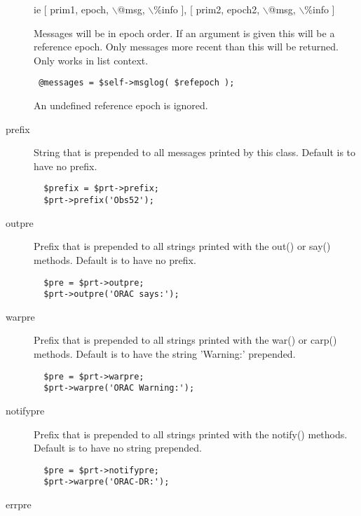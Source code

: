 \begin{description}
ie [ prim1, epoch, $\backslash$@msg, $\backslash$\%info ], [ prim2, epoch2, $\backslash$@msg, $\backslash$\%info ]



Messages will be in epoch order. If an argument is given
this will be a reference epoch. Only messages more recent
than this will be returned. Only works in list context.

\begin{verbatim}
 @messages = $self->msglog( $refepoch );
\end{verbatim}


An undefined reference epoch is ignored.


\item[{prefix}] \mbox{}

String that is prepended to all messages printed by this class.
Default is to have no prefix.

\begin{verbatim}
  $prefix = $prt->prefix;
  $prt->prefix('Obs52');
\end{verbatim}

\item[{outpre}] \mbox{}

Prefix that is prepended to all strings printed with the
out() or say() methods. Default is to have no prefix.

\begin{verbatim}
  $pre = $prt->outpre;
  $prt->outpre('ORAC says:');
\end{verbatim}

\item[{warpre}] \mbox{}

Prefix that is prepended to all strings printed with the
war() or carp() methods. Default is to have the string 'Warning:' prepended.

\begin{verbatim}
  $pre = $prt->warpre;
  $prt->warpre('ORAC Warning:');
\end{verbatim}

\item[{notifypre}] \mbox{}

Prefix that is prepended to all strings printed with the
notify() methods. Default is to have no string prepended.

\begin{verbatim}
  $pre = $prt->notifypre;
  $prt->warpre('ORAC-DR:');
\end{verbatim}

\item[{errpre}] \mbox{}


\end{description}
